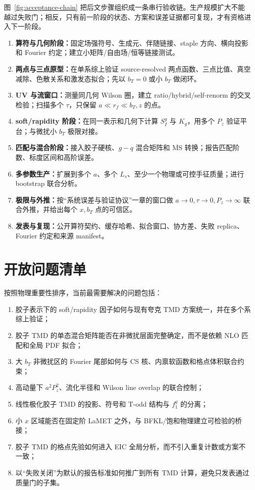 \documentclass[UTF8,12pt,a4paper,twoside,openany]{ctexbook}
\newcommand{\MSbar}{\overline{\mathrm{MS}}}
\begin{document}
图~\ref{fig:acceptance-chain} 把后文步骤组织成一条串行验收链。生产规模扩大不能越过失败门；相反，只有前一阶段的状态、方案和误差证据都可复现，才有资格进入下一阶段。
\begin{enumerate}
  \item \textbf{算符与几何阶段：}固定场强符号、生成元、伴随链接、staple 方向、横向投影和 Fourier 约定；建立小矩阵/自由场/恒等链接测试。
  \item \textbf{两点与三点原型：}在单系综上验证 source-resolved 两点函数、三点比值、真空减除、色散关系和激发态拟合；先以 \(b_T=0\) 或小 \(b_T\) 做闭环。
  \item \textbf{UV 与流窗口：}测量同几何 Wilson 圈，建立 ratio/hybrid/self-renorm 的交叉检验；扫描多个 \(\tau\)，只保留 \(a\ll r_f\ll b_T,z\) 的点。
  \item \textbf{soft/rapidity 阶段：}在同一表示和几何下计算 \(S_I^g\) 与 \(K_g\)，用多个 \(P_z\) 验证平台；与微扰小 \(b_T\) 极限对接。
  \item \textbf{匹配与混合阶段：}接入胶子硬核、\(g-q\) 混合矩阵和 \(\MSbar\) 转换；报告匹配阶数、标度区间和高阶误差。
  \item \textbf{多参数生产：}扩展到多个 \(a\)、多个 \(L_s\)、至少一个物理或可控手征质量；进行 bootstrap 联合分析。
  \item \textbf{极限与外推：}按“系统误差与验证协议”一章的窗口做 \(a\to0,\tau\to0,P_z\to\infty\) 联合外推，并给出每个 \(x,b_T\) 点的可信区。
  \item \textbf{发表与复现：}公开算符契约、缓存哈希、拟合窗口、协方差、失败 replica、Fourier 约定和来源 manifest。
\end{enumerate}

\section{开放问题清单}

按照物理重要性排序，当前最需要解决的问题包括：
\begin{enumerate}
  \item 胶子表示下的 soft/rapidity 因子如何与现有夸克 TMD 方案统一，并在多个系综上验证；
  \item 胶子 TMD 的单态混合矩阵能否在非微扰层面完整确定，而不是依赖 NLO 匹配和全局 PDF 拟合；
  \item 大 \(b_T\) 非微扰区的 Fourier 尾部如何与 CS 核、内禀软函数和格点体积联合约束；
  \item 高动量下 \(a^2P_z^2\)、流化半径和 Wilson line overlap 的联合控制；
  \item 线性极化胶子 TMD 的投影、符号和 T-odd 结构与 \(f_1^g\) 的分离；
  \item 小 \(x\) 区域能否在固定阶 LaMET 之外，与 BFKL/饱和物理建立可检验的桥接；
  \item 胶子 TMD 的格点先验如何进入 EIC 全局分析，而不引入重复计数或方案不一致；
  \item 以“失败关闭”为默认的报告标准如何推广到所有 TMD 计算，避免只发表通过质量门的子集。
\end{enumerate}
\end{document}
